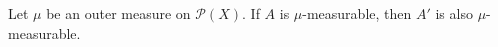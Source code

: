 Let $\mu$ be an outer measure on $\mathcal{P}(X)$. If $A$ is $\mu$-measurable, then $A'$ is also $\mu$-measurable.